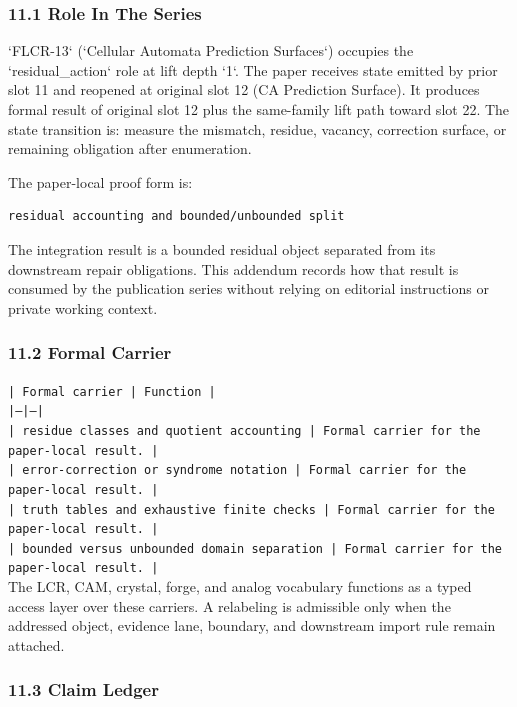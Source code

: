 \documentclass[11pt]{article}
\begin{document}
\subsubsection*{11.1 Role In The Series}

`FLCR-13` (`Cellular Automata Prediction Surfaces`) occupies the `residual\_action` role at lift depth `1`.
The paper receives state emitted by prior slot 11 and reopened at original slot 12 (CA Prediction Surface). It produces formal result of original slot 12 plus the same-family lift path toward slot 22. The state transition is:
measure the mismatch, residue, vacancy, correction surface, or remaining obligation after enumeration.

The paper-local proof form is:

\begin{verbatim}
residual accounting and bounded/unbounded split
\end{verbatim}

The integration result is a bounded residual object separated from its downstream repair obligations. This addendum records how that result is
consumed by the publication series without relying on editorial instructions or
private working context.

\subsubsection*{11.2 Formal Carrier}

\noindent\texttt{| Formal carrier | Function |}\\
\noindent\texttt{|---|---|}\\
\noindent\texttt{| residue classes and quotient accounting | Formal carrier for the paper-local result. |}\\
\noindent\texttt{| error-correction or syndrome notation | Formal carrier for the paper-local result. |}\\
\noindent\texttt{| truth tables and exhaustive finite checks | Formal carrier for the paper-local result. |}\\
\noindent\texttt{| bounded versus unbounded domain separation | Formal carrier for the paper-local result. |}\\

The LCR, CAM, crystal, forge, and analog vocabulary functions as a typed access
layer over these carriers. A relabeling is admissible only when the addressed
object, evidence lane, boundary, and downstream import rule remain attached.

\subsubsection*{11.3 Claim Ledger}
\end{document}
